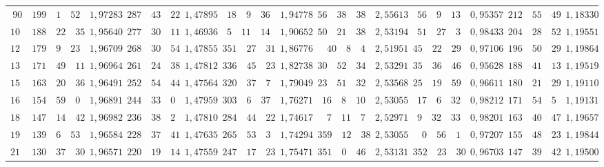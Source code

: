 \begin{landscape}
\begin{center}
\begin{tabular}{r|r|r|r|r|r|r|r|r|r|r|r|r}
\(90\) & \(199\quad 1\quad 52\) & \(1{,}97283\) & \(287\quad 43\quad 22\) & \(1{,}47895\) & \(18\quad 9\quad 36\) & \(1{,}94778\) & \(56\quad 38\quad 38\) & \(2{,}55613\) & \(56\quad 9\quad 13\) & \(0{,}95357\) & \(212\quad 55\quad 49\) & \(1{,}18330\) \\
\(105\) & \(188\quad 22\quad 35\) & \(1{,}95640\) & \(277\quad 30\quad 11\) & \(1{,}46936\) & \(5\quad 11\quad 14\) & \(1{,}90652\) & \(50\quad 21\quad 38\) & \(2{,}53194\) & \(51\quad 27\quad 3\) & \(0{,}98433\) & \(204\quad 28\quad 52\) & \(1{,}19551\) \\[3pt]
\(120\) & \(179\quad 9\quad 23\) & \(1{,}96709\) & \(268\quad 30\quad 54\) & \(1{,}47855\) & \(351\quad 27\quad 31\) & \(1{,}86776\) & \(40\quad 8\quad 4\) & \(2{,}51951\) & \(45\quad 22\quad 29\) & \(0{,}97106\) & \(196\quad 50\quad 29\) & \(1{,}19864\) \\
\(135\) & \(171\quad 49\quad 11\) & \(1{,}96964\) & \(261\quad 24\quad 38\) & \(1{,}47812\) & \(336\quad 45\quad 23\) & \(1{,}82738\) & \(30\quad 52\quad 34\) & \(2{,}53291\) & \(35\quad 36\quad 46\) & \(0{,}95628\) & \(188\quad 41\quad 13\) & \(1{,}19519\) \\
\(150\) & \(163\quad 20\quad 36\) & \(1{,}96491\) & \(252\quad 54\quad 44\) & \(1{,}47564\) & \(320\quad 37\quad 7\) & \(1{,}79049\) & \(23\quad 51\quad 32\) & \(2{,}53568\) & \(25\quad 19\quad 59\) & \(0{,}96611\) & \(180\quad 21\quad 29\) & \(1{,}19110\) \\
\(165\) & \(154\quad 59\quad 0\) & \(1{,}96891\) & \(244\quad 33\quad 0\) & \(1{,}47959\) & \(303\quad 6\quad 37\) & \(1{,}76271\) & \(16\quad 8\quad 10\) & \(2{,}53055\) & \(17\quad 6\quad 32\) & \(0{,}98212\) & \(171\quad 54\quad 5\) & \(1{,}19131\) \\[3pt]
\(180\) & \(147\quad 14\quad 42\) & \(1{,}96982\) & \(236\quad 38\quad 2\) & \(1{,}47810\) & \(284\quad 44\quad 22\) & \(1{,}74617\) & \(7\quad 11\quad 7\) & \(2{,}52971\) & \(9\quad 32\quad 33\) & \(0{,}98201\) & \(163\quad 40\quad 47\) & \(1{,}19657\) \\
\(195\) & \(139\quad 6\quad 53\) & \(1{,}96584\) & \(228\quad 37\quad 41\) & \(1{,}47635\) & \(265\quad 53\quad 3\) & \(1{,}74294\) & \(359\quad 12\quad 38\) & \(2{,}53055\) & \(0\quad 56\quad 1\) & \(0{,}97207\) & \(155\quad 48\quad 23\) & \(1{,}19844\) \\
\(210\) & \(130\quad 37\quad 30\) & \(1{,}96571\) & \(220\quad 19\quad 14\) & \(1{,}47559\) & \(247\quad 17\quad 23\) & \(1{,}75471\) & \(351\quad 0\quad 46\) & \(2{,}53131\) & \(352\quad 23\quad 30\) & \(0{,}96703\) & \(147\quad 39\quad 42\) & \(1{,}19500\) \\

\end{tabular}
\end{center}
\end{landscape}
